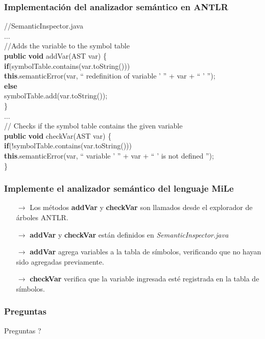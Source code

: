 \documentclass{beamer}
\begin{document}
		\begin{frame}
			\frametitle{Implementaci\'on del analizador sem\'antico en ANTLR}
			
			\begin{block}{}
			//SemanticInspector.java \\
            $\ldots$ \\
            //Adds the variable to the symbol table \\
            \textbf{public} \textbf{void} addVar(AST var) \{ \\
            \hspace{5pt} \textbf{if}(symbolTable.contains(var.toString())) \\
            \hspace{10pt} \textbf{this}.semanticError(var, `` redefinition of variable ' '' + var + `` ' ''); \\
            \hspace{5pt} \textbf{else} \\
            \hspace{10pt} symbolTable.add(var.toString()); \\
            \} \\
            $\ldots$ \\
            // Checks if the symbol table contains the given variable \\
            \textbf{public} \textbf{void} checkVar(AST var) \{\\
            \hspace{5pt} \textbf{if}(!symbolTable.contains(var.toString()))\\
            \hspace{10pt} \textbf{this}.semanticError(var, `` variable ' '' + var + `` ' is not defined '');\\
            \}
            \end{block}
	    \end{frame}

	    \begin{frame}
			\frametitle{Implemente el analizador sem\'antico del lenguaje MiLe}

			\begin{itemize}
			    \item[$\rightarrow$] Los m\'etodos \textbf{addVar} y \textbf{checkVar} son llamados desde el explorador de \'arboles ANTLR.
			    \item[$\rightarrow$] \textbf{addVar} y \textbf{checkVar} est\'an definidos en \emph{SemanticInspector.java} 
			    \item[$\rightarrow$] \textbf{addVar} agrega variables a la tabla de s\'imbolos, verificando que no hayan sido agregadas previamente.
			    \item[$\rightarrow$] \textbf{checkVar} verifica que la variable ingresada est\'e registrada en la tabla de s\'imbolos.
			\end{itemize}
        \end{frame}

		\begin{frame}
			\frametitle{Preguntas}

			\hspace{4cm}\huge{Preguntas ?}
		
		\end{frame}
	
\end{document}
